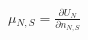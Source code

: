 \documentclass[border=2pt]{standalone}
\begin{document}
${{\mu}}{_{N, S}}=\frac{\partial{{U}{_{N}}}}{\partial{{n}{_{N, S}}}}$
\end{document}
